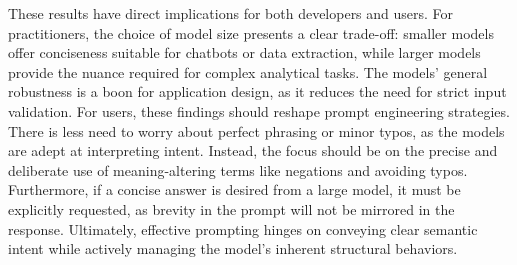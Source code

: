\documentclass[a4paper,
               ]{jacow}
\begin{document}
These results have direct implications for both developers and users. For practitioners, the choice of model size presents a clear trade-off: smaller models offer conciseness suitable for chatbots or data extraction, while larger models provide the nuance required for complex analytical tasks. The models' general robustness is a boon for application design, as it reduces the need for strict input validation. For users, these findings should reshape prompt engineering strategies. There is less need to worry about perfect phrasing or minor typos, as the models are adept at interpreting intent. Instead, the focus should be on the precise and deliberate use of meaning-altering terms like negations and avoiding typos. Furthermore, if a concise answer is desired from a large model, it must be explicitly requested, as brevity in the prompt will not be mirrored in the response. Ultimately, effective prompting hinges on conveying clear semantic intent while actively managing the model's inherent structural behaviors.
\end{document}
